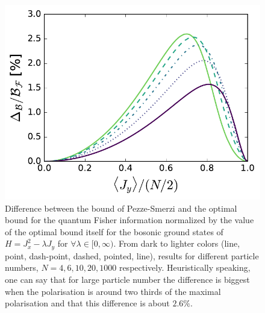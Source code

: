 \begin{figure}
  \centering
  \includegraphics[scale=.65]{img/plots/LT_edge_diff.pdf}
  \caption{Difference between the bound of Pezze-Smerzi and the optimal bound for the quantum Fisher information normalized by the value of the optimal bound itself for the bosonic ground states of $H=J_x^2-\lambda J_y$ for $\forall \lambda \in [0,\infty)$.
  From dark to lighter colors (line, point, dash-point, dashed, pointed, line), results for different particle numbers, $N=4,6,10,20,1000$ respectively.
  Heuristically speaking, one can say that for large particle number the difference is biggest when the polarisation is around two thirds of the maximal polarisation and that this difference is about $2.6\%$.}
  \label{fig:lt-edge-diff}
\end{figure}

\begin{figure}
  \centering
  \caption{}
  \label{fig:lt-spsq-scaling}
\end{figure}

